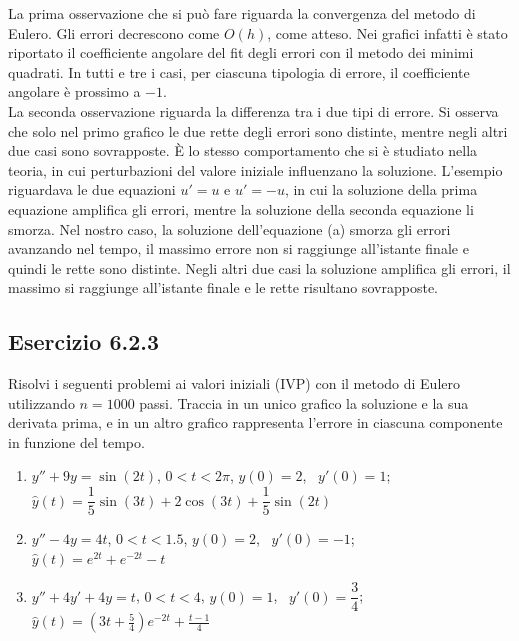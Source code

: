 \documentclass[letterpaper, 12pt]{article}
\numberwithin{equation}{section}    %
\begin{document}
La prima osservazione che si può fare riguarda la convergenza del metodo di Eulero.
Gli errori decrescono come $O(h)$, come atteso. 
Nei grafici infatti è stato riportato il coefficiente
angolare del fit degli errori con il metodo dei minimi quadrati. In tutti e tre i casi, per ciascuna
tipologia di errore, il coefficiente angolare è prossimo a $-1$. \\
La seconda osservazione riguarda la differenza tra i due tipi di errore. Si osserva che solo nel primo grafico 
le due rette degli errori sono distinte, mentre negli altri due casi sono sovrapposte. È lo stesso 
comportamento che si è studiato nella teoria, in cui perturbazioni del valore iniziale influenzano la soluzione.
L'esempio riguardava le due equazioni $u' = u$ e $u' = -u $, in cui la soluzione
della prima equazione amplifica gli errori, mentre la soluzione della seconda equazione li smorza. 
Nel nostro caso, la soluzione dell'equazione (a) smorza gli errori avanzando nel tempo, il massimo 
errore non si raggiunge all'istante finale e quindi le rette sono distinte.
Negli altri due casi la soluzione amplifica gli errori, il massimo si raggiunge all'istante finale e le rette
risultano sovrapposte.

\subsection{Esercizio 6.2.3}
Risolvi i seguenti problemi ai valori iniziali (IVP) con il metodo di Eulero utilizzando $n=1000$ passi. 
Traccia in un unico grafico la soluzione e la sua derivata prima, e in un altro grafico rappresenta l'errore 
in ciascuna componente in funzione del tempo.\\
\begin{enumerate}[label=(\alph*)]
    \item $y''+ 9y = \sin(2t)$, \quad $0< t< 2\pi$, \quad $y(0) = 2$, \ $y'(0) = 1$;\\[2pt]
    \hspace*{1.5em} $\hat{y}(t) = \dfrac{1}{5} \sin(3t) + 2 \cos (3t) + \dfrac{1}{5} \sin (2t)$
    \item $y''- 4y = 4t$, \quad $0< t< 1.5$, \quad $y(0) = 2$, \ $y'(0) = -1$;\\[2pt]
    \hspace*{1.5em} $\hat{y}(t) = e^{2t} + e^{-2t} - t$
    \item $y''+ 4y'+ 4y = t$, \quad $0< t< 4$, \quad $y(0) = 1$, \ $y'(0) = \dfrac{3}{4}$;\\[2pt]
    \hspace*{1.5em} $\hat{y}(t) = (3t+\frac{5}{4})e^{-2t} + \frac{t-1}{4}$
\end{enumerate}
\end{document}
